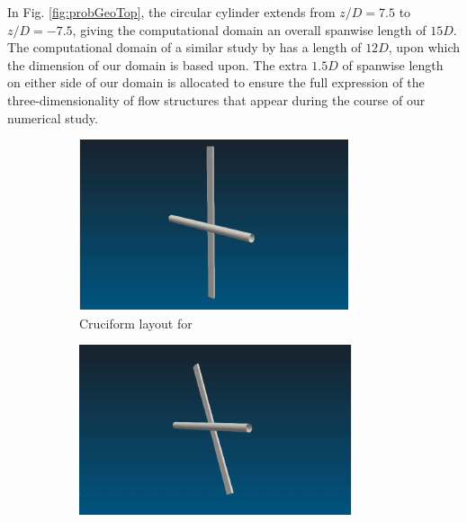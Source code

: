 \documentclass[a4paper,fleqn]{cas-sc}
\begin{document}
In Fig. \ref{fig:probGeoTop}, the circular cylinder extends from $z/D=7.5$ to $z/D=-7.5$, giving the computational domain an overall spanwise length of $15D$. The computational domain of a similar study by \citet{Deng2007} has a length of $12D$, upon which the dimension of our domain is based upon. The extra $1.5D$ of spanwise length on either side of our domain is allocated to ensure the full expression of the three-dimensionality of flow structures that appear during the course of our numerical study.

\begin{figure}
  \centering
  \begin{subfigure}[h]{0.3\textwidth}
    \includegraphics[width=\textwidth]{figs/cruciform90}
    \caption{Cruciform layout for \angfi{}}
    \label{fig:cruciform90}
  \end{subfigure}
  \hfill
  \begin{subfigure}[h]{0.3\textwidth}
    \includegraphics[width=\textwidth]{figs/cruciform675}

\end{subfigure}
\end{figure}
\end{document}
